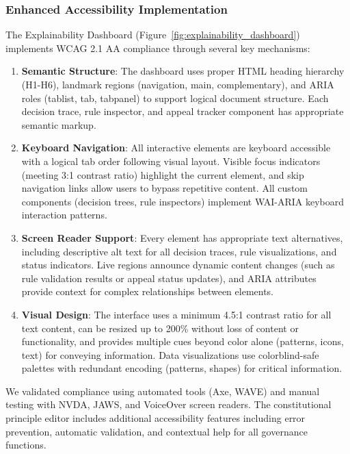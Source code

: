 \documentclass[manuscript,screen,review,anonymous,9pt]{acmart}
\begin{document}
\subsubsection{Enhanced Accessibility Implementation}
\label{subsubsec:enhanced_accessibility}
The Explainability Dashboard (Figure~\ref{fig:explainability_dashboard}) implements WCAG 2.1 AA compliance through several key mechanisms:

\begin{enumerate}
    \item \textbf{Semantic Structure}: The dashboard uses proper HTML heading hierarchy (H1-H6), landmark regions (navigation, main, complementary), and ARIA roles (tablist, tab, tabpanel) to support logical document structure. Each decision trace, rule inspector, and appeal tracker component has appropriate semantic markup.
    
    \item \textbf{Keyboard Navigation}: All interactive elements are keyboard accessible with a logical tab order following visual layout. Visible focus indicators (meeting 3:1 contrast ratio) highlight the current element, and skip navigation links allow users to bypass repetitive content. All custom components (decision trees, rule inspectors) implement WAI-ARIA keyboard interaction patterns.
    
    \item \textbf{Screen Reader Support}: Every element has appropriate text alternatives, including descriptive alt text for all decision traces, rule visualizations, and status indicators. Live regions announce dynamic content changes (such as rule validation results or appeal status updates), and ARIA attributes provide context for complex relationships between elements.
    
    \item \textbf{Visual Design}: The interface uses a minimum 4.5:1 contrast ratio for all text content, can be resized up to 200\% without loss of content or functionality, and provides multiple cues beyond color alone (patterns, icons, text) for conveying information. Data visualizations use colorblind-safe palettes with redundant encoding (patterns, shapes) for critical information.
\end{enumerate}

We validated compliance using automated tools (Axe, WAVE) and manual testing with NVDA, JAWS, and VoiceOver screen readers. The constitutional principle editor includes additional accessibility features including error prevention, automatic validation, and contextual help for all governance functions.
\end{document}
